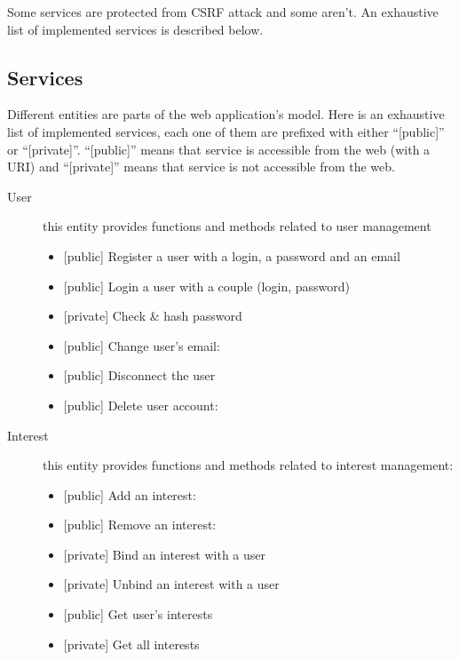 \documentclass[a4paper,11pt,openany]{report}
\begin{document}
Some services are protected from CSRF attack and some aren't. An exhaustive list of implemented 
services is described below.

\subsection{Services}

Different entities are parts of the web application's model. Here is an exhaustive list of implemented 
services, each one of them are prefixed with either ``[public]'' or ``[private]''. ``[public]'' means that 
service is accessible from the web (with a URI) and ``[private]'' means that service is not accessible from 
the web.
\begin{description}
 \item[User] this entity provides functions and methods related to user management
 \begin{itemize}[label=--]
  \item {[}public{]} Register a user with a login, a password and an email
  \item {[}public{]} Login a user with a couple (login, password)
  \item {[}private{]} Check \& hash password
  \item {[}public{]} Change user's email: \color{red}{vulnerable to CSRF attack}\color{black}{}
  \item {[}public{]} Disconnect the user
  \item {[}public{]} Delete user account: \color{green}{protected against CSRF attack}\color{black}{}
 \end{itemize}
 
 \item[Interest] this entity provides functions and methods related to interest management:
 \begin{itemize}[label=--]
  \item {[}public{]} Add an interest: \color{green}{protected against CSRF attack}\color{black}{}
  \item {[}public{]} Remove an interest: \color{red}{vulnerable to CSRF attack}\color{black}{}
  \item {[}private{]} Bind an interest with a user
  \item {[}private{]} Unbind an interest with a user
  \item {[}public{]} Get user's interests
  \item {[}private{]} Get all interests
 \end{itemize}


\end{description}
\end{document}
